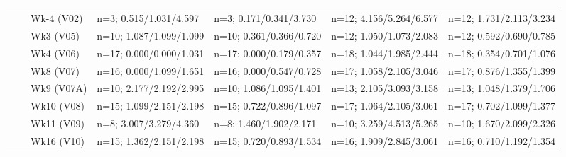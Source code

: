 \documentclass[
]{article}
\begin{document}
\begin{table}[!h]
\begin{tabular}[t]{lllllll}
\cmidrule{2-7}
\addlinespace[0.3em]
\multicolumn{7}{l}{\textit{100µg}}\\
\hspace{1em}\hspace{1em} &  & Wk-4 (V02) & n=3; 0.515/1.031/4.597 & n=3; 0.171/0.341/3.730 & n=12; 4.156/5.264/6.577 & n=12; 1.731/2.113/3.234\\
\cmidrule{3-7}
\hspace{1em}\hspace{1em} &  & Wk3 (V05) & n=10; 1.087/1.099/1.099 & n=10; 0.361/0.366/0.720 & n=12; 1.050/1.073/2.083 & n=12; 0.592/0.690/0.785\\
\cmidrule{3-7}
\hspace{1em}\hspace{1em} &  & Wk4 (V06) & n=17; 0.000/0.000/1.031 & n=17; 0.000/0.179/0.357 & n=18; 1.044/1.985/2.444 & n=18; 0.354/0.701/1.076\\
\cmidrule{3-7}
\hspace{1em}\hspace{1em} &  & Wk8 (V07) & n=16; 0.000/1.099/1.651 & n=16; 0.000/0.547/0.728 & n=17; 1.058/2.105/3.046 & n=17; 0.876/1.355/1.399\\
\cmidrule{3-7}
\hspace{1em}\hspace{1em} &  & Wk9 (V07A) & n=10; 2.177/2.192/2.995 & n=10; 1.086/1.095/1.401 & n=13; 2.105/3.093/3.158 & n=13; 1.048/1.379/1.706\\
\cmidrule{3-7}
\hspace{1em}\hspace{1em} &  & Wk10 (V08) & n=15; 1.099/2.151/2.198 & n=15; 0.722/0.896/1.097 & n=17; 1.064/2.105/3.061 & n=17; 0.702/1.099/1.377\\
\cmidrule{3-7}
\hspace{1em}\hspace{1em} &  & Wk11 (V09) & n=8; 3.007/3.279/4.360 & n=8; 1.460/1.902/2.171 & n=10; 3.259/4.513/5.265 & n=10; 1.670/2.099/2.326\\
\cmidrule{3-7}
\hspace{1em}\hspace{1em} &  & Wk16 (V10) & n=15; 1.362/2.151/2.198 & n=15; 0.720/0.893/1.534 & n=16; 1.909/2.845/3.061 & n=16; 0.710/1.192/1.354\\
\bottomrule
\end{tabular}
\end{table}
\end{document}
